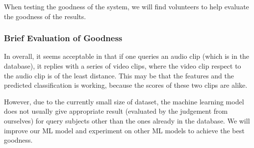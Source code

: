 \documentclass{report}
\begin{document}
When testing the goodness of the system, we will find volunteers to help evaluate the goodness of the results.

\subsubsection{Brief Evaluation of Goodness}

In overall, it seems acceptable in that if one queries an audio clip (which is in the database), it replies with a series of video clips, where the video clip respect to the audio clip is of the least distance. This may be that the features and the predicted classification is working, because the scores of these two clips are alike.

However, due to the currently small size of dataset, the machine learning model does not usually give appropriate result (evaluated by the judgement from ourselves) for query subjects other than the ones already in the database. We will improve our ML model and experiment on other ML models to achieve the best goodness.


\nocite{*}

\end{document}
